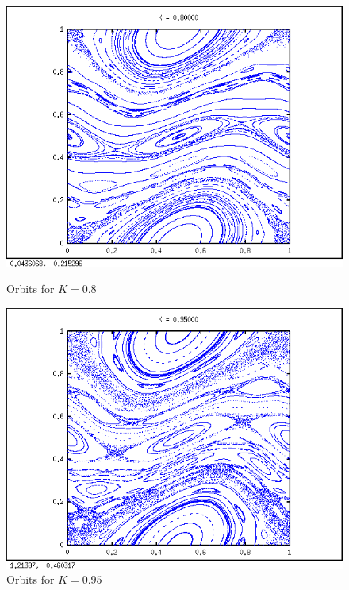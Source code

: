 \documentclass[a4paper,11pt]{article}
\begin{document}
\begin{figure}[H]
\centering
\begin{minipage}{0.5\textwidth}
\centering
\includegraphics[width=\textwidth]{k08.png}
\caption{Orbits for $K = 0.8$}
\end{minipage}\hfill
\begin{minipage}{0.5\textwidth}
\centering
\includegraphics[width=\textwidth]{k095.png}
\caption{Orbits for $K = 0.95$}
\end{minipage}
\end{figure}
\end{document}
